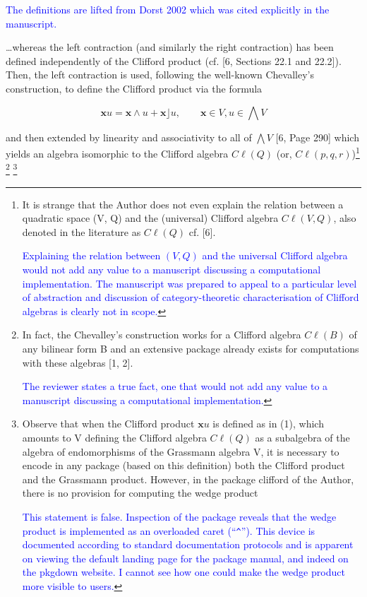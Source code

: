 \documentclass{article}
\newcommand{\cliff}[1]{\ensuremath{C\ell\left(#1\right)}}
\begin{document}
\begin{itemize}
    \textcolor{blue}{The definitions are lifted from Dorst 2002 which
      was cited explicitly in the manuscript.}

    \ldots whereas the left contraction (and similarly the
    right contraction) has been defined independently of the Clifford
    product (cf. [6, Sections 22.1 and 22.2]). Then, the left
    contraction is used, following the well-known Chevalley’s
    construction, to define the Clifford product via the formula

    $$
    \mathbf{x}u=\mathbf{x}\wedge u + \mathbf{x}\rfloor u,\qquad\mathbf{x}\in V,u\in\bigwedge V
    $$

and then extended by linearity and associativity to all of $\bigwedge V$ [6, Page
  290] which yields an algebra isomorphic to the Clifford algebra
\cliff{Q} (or, \cliff{p, q, r})\footnote{It is strange that the Author
does not even explain the relation between a quadratic space (V, Q)
and the (universal) Clifford algebra \cliff{V, Q}, also denoted in the
literature as \cliff{Q} cf. [6].

\textcolor{blue}{Explaining the relation between $(V,Q)$ and the
  universal Clifford algebra would not add any value to a manuscript
  discussing a computational implementation.  The manuscript was
  prepared to appeal to a particular level of abstraction and
  discussion of category-theoretic characterisation of Clifford
  algebras is clearly not in scope.}  } \footnote{In fact, the
Chevalley’s construction works for a Clifford algebra \cliff{B} of any
bilinear form B and an extensive package already exists for
computations with these algebras [1, 2].

\textcolor{blue}{The reviewer states a true fact, one that would not
  add any value to a manuscript discussing a computational
  implementation.}} \footnote{Observe that when the Clifford product
$\mathbf{x}u$ is defined as in (1), which amounts to V defining the Clifford
algebra \cliff{Q} as a subalgebra of the algebra of endomorphisms of
the Grassmann algebra V, it is necessary to encode in any package
(based on this definition) both the Clifford product and the Grassmann
product. However, in the package clifford of the Author, there is no
provision for computing the wedge product

\textcolor{blue}{This statement is false.  Inspection
  of the package reveals that the wedge product is implemented as an
  overloaded caret (``{\tt\string^}'').  This device is documented
  according to standard documentation protocols and is apparent on
  viewing the default landing page for the package manual, and indeed
  on the pkgdown website.  I cannot see how one could make the wedge
  product more visible to users.}  }


\end{itemize}
\end{document}
